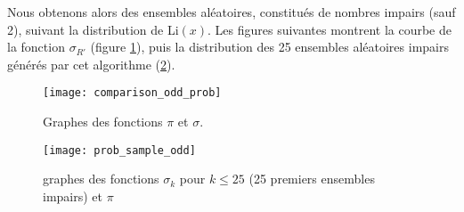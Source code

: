 \documentclass[../main.tex]{report}
\begin{document}
Nous obtenons alors des ensembles aléatoires, constitués de nombres impairs (sauf 2), suivant la distribution de Li$(x)$. 
Les figures suivantes montrent la courbe de la fonction $\sigma_{R'}$ (figure \ref{fig:comparison_sigma_prob}), puis la distribution des 25 ensembles aléatoires impairs générés par cet algorithme (\ref{fig:prob_sample_odd}).

\begin{figure}[H]
\centering
\texttt{[image: comparison\_odd\_prob]}
\caption{Graphes des fonctions $\pi$ et $\sigma$.}
\label{fig:comparison_sigma_prob}
\end{figure}

\begin{figure}[H]
	\centering
	\texttt{[image: prob\_sample\_odd]}
	\caption{graphes des fonctions $\sigma_k$ pour $k \leq 25$ (25 premiers ensembles impairs) et $\pi$}
	\label{fig:prob_sample_odd}
\end{figure}
\end{document}
